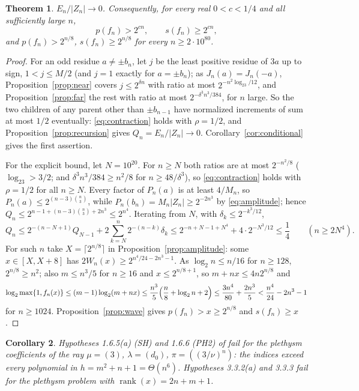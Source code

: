 \documentclass[11pt,a4paper]{article}
\newtheorem{theorem}{Theorem}[section]
\newtheorem{corollary}[theorem]{Corollary}
\theoremstyle{definition}
\newcommand{\rank}{\operatorname{rank}}
\begin{document}
\begin{theorem}\label{thm:indices}
$E_n/|Z_n|\to0$. Consequently, for every real $0<c<1/4$ and all sufficiently
large $n$,
\[
 p(f_n)>2^{cn},\qquad s(f_n)\ge2^{cn},
\]
and $p(f_n)>2^{n/8}$, $s(f_n)\ge2^{n/8}$ for every $n\ge2\cdot10^{80}$.
\end{theorem}

\begin{proof}
For an odd residue $a\ne\pm b_n$, let $j$ be the least positive residue of $3a$
up to sign, $1<j\le M/2$ (and $j=1$ exactly for $a=\pm b_n$); as
$J_n(a)=J_n(-a)$, Proposition~\ref{prop:near} covers $j\le2^{\delta n}$ with
ratio at most $2^{-n^2\log_23/12}$, and Proposition~\ref{prop:far} the rest with
ratio at most $2^{-\delta^3n^3/384}$, for $n$ large. So the two children of any parent other than $\pm b_{n-1}$ have normalized increments of
sum at most $1/2$ eventually: \eqref{eq:contraction} holds with $\rho=1/2$, and
Proposition~\ref{prop:recursion} gives $Q_n=E_n/|Z_n|\to0$.
Corollary~\ref{cor:conditional} gives the first assertion.

For the explicit bound, let $N=10^{20}$. For $n\ge N$ both ratios are at most
$2^{-n^2/8}$ ($\log_23>3/2$; and $\delta^3n^3/384\ge n^2/8$ for
$n\ge48/\delta^3$), so \eqref{eq:contraction} holds with $\rho=1/2$ for all
$n\ge N$. Every factor of $P_n(a)$ is at least $4/M_n$, so
$P_n(a)\le2^{(n-3)\binom n3}$, while $P_n(b_n)=M_n|Z_n|\ge2^{-2n^3}$ by
\eqref{eq:amplitude}; hence $Q_n\le2^{n-1+(n-3)\binom n3+2n^3}\le2^{n^4}$.
Iterating from $N$, with $\delta_k\le2^{-k^3/12}$,
\[
 Q_n\le2^{-(n-N+1)}Q_{N-1}+2\sum_{k=N}^n2^{-(n-k)}\delta_k
 \le2^{-n+N-1+N^4}+4\cdot2^{-N^3/12}\le\frac14\qquad(n\ge2N^4).
\]
For such $n$ take $X=\lceil2^{n/8}\rceil$ in Proposition~\ref{prop:amplitude}:
some $x\in[X,X+8]$ has $2W_n(x)\ge2^{n^4/24-2n^3-1}$. As $\log_2n\le n/16$ for
$n\ge128$, $2^{n/8}\ge n^2$; also $m\le n^3/5$ for $n\ge16$ and $x\le2^{n/8+1}$,
so $m+nx\le4n2^{n/8}$ and
\[
 \log_2\max\{1,f_n(x)\}\le(m-1)\log_2(m+nx)\le\frac{n^3}5\Bigl(\frac n8+
 \log_2n+2\Bigr)\le\frac{3n^4}{80}+\frac{2n^3}5<\frac{n^4}{24}-2n^3-1
\]
for $n\ge1024$. Proposition~\ref{prop:wave} gives $p(f_n)>x\ge2^{n/8}$ and
$s(f_n)\ge x$.
\end{proof}

\begin{corollary}\label{cor:PH2SH}
Hypotheses 1.6.5(a) (SH) and 1.6.6 (PH2) of \cite{GCT6} fail for the plethysm
coefficients of the ray $\mu=(3)$, $\lambda=(d_0)$, $\pi=((3/\nu)^n)$: the
indices exceed every polynomial in $h=m^2+n+1=\Theta(n^6)$. Hypotheses
3.3.2(a) and 3.3.3 fail for the plethysm problem with $\rank(x)=2n+m+1$.
\end{corollary}
\end{document}
